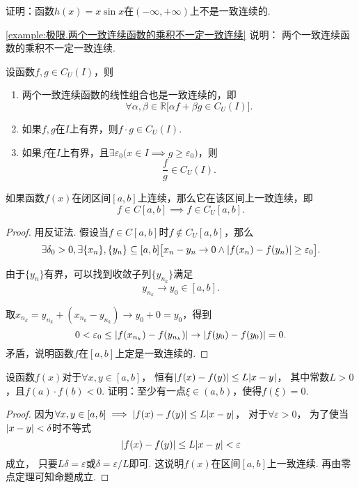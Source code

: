 \begin{example}\label{example:极限.两个一致连续函数的乘积不一定一致连续}
证明：函数\(h(x) = x \sin x\)在\((-\infty,+\infty)\)上不是一致连续的.
\end{example}
\cref{example:极限.两个一致连续函数的乘积不一定一致连续} 说明：
两个一致连续函数的乘积不一定一致连续.

\begin{theorem}[一致连续函数的四则运算法则]\label{theorem:极限.闭区间上连续函数的性质.一致连续函数的四则运算法则}
设函数\(f,g \in C_U(I)\)，则
\begin{enumerate}
\item 两个一致连续函数的线性组合也是一致连续的，即\[
\forall\alpha,\beta\in\mathbb{R} \bigl[ \alpha f + \beta g \in C_U(I) \bigr].
\]

\item 如果\(f,g\)在\(I\)上有界，则\(f \cdot g \in C_U(I)\).

\item 如果\(f\)在\(I\)上有界，且\(\exists\varepsilon_0 \bigl( x \in I \implies g \geq \varepsilon_0 \bigr)\)，则\[
\frac{f}{g} \in C_U(I).
\]
\end{enumerate}
\end{theorem}

\begin{theorem}[一致连续性定理]\label{theorem:极限.闭区间上连续函数的性质.一致连续性定理}
如果函数\(f(x)\)在闭区间\([a,b]\)上连续，那么它在该区间上一致连续，即\[
f \in C[a,b]
\implies
f \in C_U[a,b].
\]
\begin{proof}
用反证法.
假设当\(f \in C[a,b]\)时\(f \notin C_U[a,b]\)，那么\[
\exists\delta_0>0,
\exists\{x_n\},\{y_n\}\subseteq[a,b]
\bigl[
x_n-y_n\to0
\land
\abs{f(x_n)-f(y_n)}\geq\varepsilon_0
\bigr].
\]

由于\(\{y_n\}\)有界，可以找到收敛子列\(\{y_{n_k}\}\)满足\[
y_{n_k} \to y_0\in[a,b].
\]

取\(x_{n_k} = y_{n_k} + (x_{n_k} - y_{n_k})
\to y_0 + 0 = y_0\)，得到\[
0 < \varepsilon_0 \leq \abs{f(x_{n_k})-f(y_{n_k})}
\to \abs{f(y_0)-f(y_0)} = 0.
\]矛盾，说明函数\(f\)在\([a,b]\)上定是一致连续的.
\end{proof}
\end{theorem}

\begin{example}
设函数\(f(x)\)对于\(\forall x,y \in [a,b]\)，
恒有\(\abs{f(x) - f(y)} \leq L \abs{x - y}\)，
其中常数\(L > 0\)，且\(f(a) \cdot f(b) < 0\).
证明：至少有一点\(\xi \in (a,b)\)，使得\(f(\xi) = 0\).
\begin{proof}
因为\(\forall x,y \in [a,b] \implies \abs{f(x) - f(y)} \leq L \abs{x - y}\)，
对于\(\forall \varepsilon > 0\)，
为了使当\(\abs{x - y} < \delta\)时不等式\[
\abs{f(x) - f(y)} \leq L \abs{x - y} < \varepsilon
\]成立，
只要\(L \delta = \varepsilon\)或\(\delta = \varepsilon / L\)即可.
这说明\(f(x)\)在区间\([a,b]\)上一致连续.
再由零点定理可知命题成立.
\end{proof}
\end{example}


